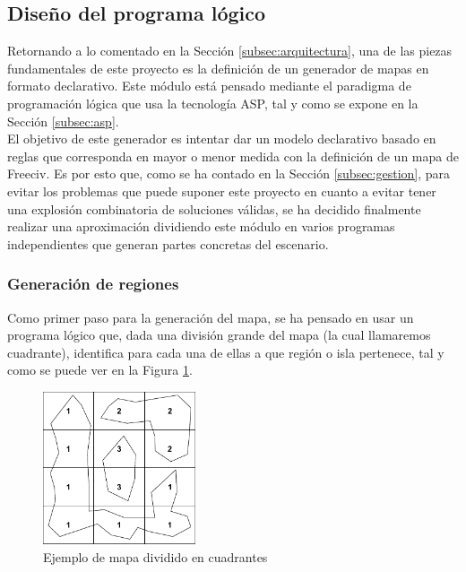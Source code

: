 \subsection{Diseño del programa lógico}
\label{subsubsec:generator}

Retornando a lo comentado en la Sección \ref{subsec:arquitectura}, una de las piezas fundamentales de este proyecto es la definición de un generador de mapas en formato declarativo. Este módulo está pensado mediante el paradigma de programación lógica que usa la tecnología ASP, tal y como se expone en la Sección \ref{subsec:asp}. \\

El objetivo de este generador es intentar dar un modelo declarativo basado en reglas que corresponda en mayor o menor medida con la definición de un mapa de Freeciv. Es por esto que, como se ha contado en la Sección \ref{subsec:gestion}, para evitar los problemas que puede suponer este proyecto en cuanto a evitar tener una explosión combinatoria de soluciones válidas, se ha decidido finalmente realizar una aproximación dividiendo este módulo en varios programas independientes que generan partes concretas del escenario. \\

\subsubsection{Generación de regiones}
\label{subsubsec:regiones}

Como primer paso para la generación del mapa, se ha pensado en usar un programa lógico que, dada una división grande del mapa (la cual llamaremos cuadrante), identifica para cada una de ellas a que región o isla pertenece, tal y como se puede ver en la Figura \ref{fig:regiones}.

\begin{figure}[!h]
	\centering
	\includegraphics[width=0.4\textwidth]{images/regiones.pdf}
	\caption{Ejemplo de mapa dividido en cuadrantes}
	\label{fig:regiones}
\end{figure}


